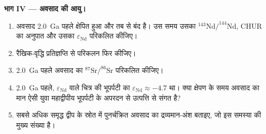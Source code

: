 \begin{problem}
\noindent\textbf{भाग IV --- अवसाद की आयु।}
\begin{enumerate}[resume]
\item अवसाद \qty{2.0}{Ga} पहले क्षेपित हुआ और तब से बंद है।
उस समय उसका $^{143}\mathrm{Nd}/^{144}\mathrm{Nd}$, CHUR का अनुपात और उसका
$\varepsilon_{\mathrm{Nd}}$ परिकलित कीजिए।
\item रैखिक-वृद्धि प्रतिज्ञप्ति से परिकलन फिर कीजिए।
\item \qty{2.0}{Ga} पहले अवसाद का $^{87}\mathrm{Sr}/^{86}\mathrm{Sr}$ परिकलित कीजिए।
\item \qty{2.0}{Ga} पहले, $\varepsilon_{\mathrm{Nd}}$ वाले चित्र की भूपर्पटी का
$\varepsilon_{\mathrm{Nd}} \approx -4.7$ था। क्या क्षेपण के समय अवसाद का मान
ऐसी युवा महाद्वीपीय भूपर्पटी के अपरदन से उत्पत्ति से संगत है?
\item सबसे अधिक समृद्ध द्वीप के स्रोत में पुनर्चक्रित अवसाद का द्रव्यमान-अंश बताइए,
जो इस समस्या की मुख्य संख्या है।
\end{enumerate}
\end{problem}
